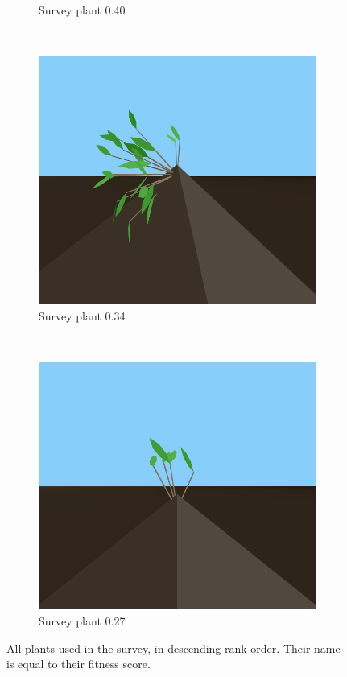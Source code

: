 \begin{figure}
\begin{subfigure}{0.48\textwidth}
        \caption{Survey plant 0.40}
    \end{subfigure}
    \\
    \begin{subfigure}{0.48\textwidth}
        \includegraphics[width=\textwidth]{figures/plant-34}
        \caption{Survey plant 0.34}
    \end{subfigure}
    ~
    \begin{subfigure}{0.48\textwidth}
        \includegraphics[width=\textwidth]{figures/plant-27}
        \caption{Survey plant 0.27}
    \end{subfigure}
    \ContinuedFloat
    \caption[All plants used in the survey]{All plants used in the survey, in descending rank order. Their name is equal to their fitness score.}
    \label{fig:survey-plants}
\end{figure}
